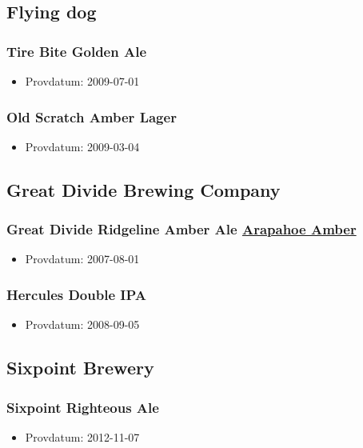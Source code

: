 \documentclass[11pt]{article}
\begin{document}
\subsection{Flying dog}
\label{sec:orgef0ff14}
\subsubsection{Tire Bite Golden Ale}
\label{sec:org63c8000}
\begin{itemize}
\item Provdatum: 2009-07-01
\end{itemize}
\subsubsection{Old Scratch Amber Lager}
\label{sec:org972a0db}
\begin{itemize}
\item Provdatum: 2009-03-04
\end{itemize}
\subsection{Great Divide Brewing Company}
\label{sec:org85fc8f0}
\subsubsection{Great Divide Ridgeline Amber Ale \underline{Arapahoe Amber}}
\label{sec:orgcd65867}
\begin{itemize}
\item Provdatum: 2007-08-01
\end{itemize}
\subsubsection{Hercules Double IPA}
\label{sec:org25c34b4}
\begin{itemize}
\item Provdatum: 2008-09-05
\end{itemize}
\subsection{Sixpoint Brewery}
\label{sec:orgb6e1c37}
\subsubsection{Sixpoint Righteous Ale}
\label{sec:org0eb3205}
\begin{itemize}
\item Provdatum: 2012-11-07
\end{itemize}
\end{document}
